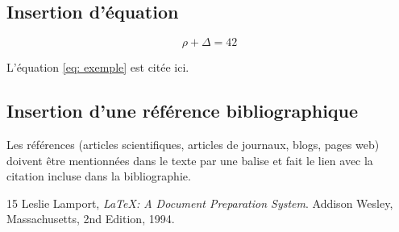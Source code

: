 \documentclass{rapportCS}
\begin{document}
\subsection{Insertion d'équation}

\begin{equation} \label{eq: exemple}
\rho + \Delta = 42
\end{equation}

L'équation \ref{eq: exemple} est citée ici. 

\subsection{Insertion d'une référence bibliographique}
Les références (articles scientifiques, articles de journaux, blogs, pages web) doivent être mentionnées dans le texte par une balise \cite{maref} et fait le lien avec la citation incluse dans la bibliographie.


\begin{thebibliography}{15} %
	  Leslie Lamport,
	  \emph{\LaTeX: A Document Preparation System}.
	  Addison Wesley, Massachusetts,
	  2nd Edition,
	  1994.
\end{thebibliography}
\end{document}
